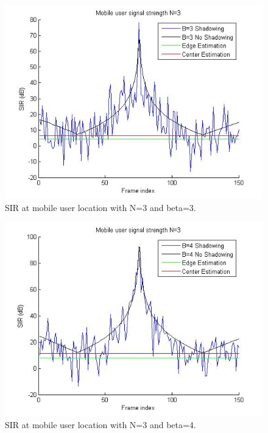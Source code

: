 \documentclass{article}
\begin{document}
\begin{figure}[h]
\centerline{\includegraphics[width=5in]{latex/images/N3B3.jpg}}
\caption{SIR at mobile user location with N=3 and beta=3.}
\label{N3B3}
\end{figure}

\begin{figure}[h]
\centerline{\includegraphics[width=5in]{latex/images/N3B4.jpg}}
\caption{SIR at mobile user location with N=3 and beta=4.}
\label{N3B4}
\end{figure}
\end{document}
